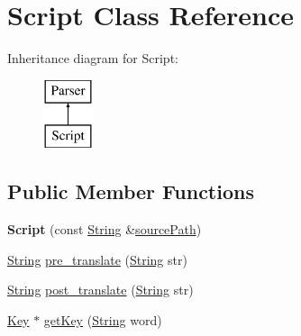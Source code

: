 \hypertarget{classScript}{}\section{Script Class Reference}
\label{classScript}
Inheritance diagram for Script\+:\begin{figure}[H]
\begin{center}
\leavevmode
\includegraphics[height=2.000000cm]{classScript}
\end{center}
\end{figure}
\subsection*{Public Member Functions}
\begin{DoxyCompactItemize}
\item 
\mbox{\label{classScript_ad9e14ce089abb34c1acb97fcfd161b54}} 
{\bfseries Script} (const \mbox{\hyperlink{classString}{String}} \&\mbox{\hyperlink{classParser_a9af73d63c4685837209f362dababa554}{source\+Path}})
\item 
\mbox{\hyperlink{classString}{String}} \mbox{\hyperlink{classScript_af94dd912c6276f5130d13740d775200c}{pre\+\_\+translate}} (\mbox{\hyperlink{classString}{String}} str)
\item 
\mbox{\hyperlink{classString}{String}} \mbox{\hyperlink{classScript_a754cc2f448013d0a3b400088e460fbe4}{post\+\_\+translate}} (\mbox{\hyperlink{classString}{String}} str)
\item 
\mbox{\hyperlink{classKey}{Key}} $\ast$ \mbox{\hyperlink{classScript_a027acbd1cfa4440c9eb51a2b6c91c6a0}{get\+Key}} (\mbox{\hyperlink{classString}{String}} word)
\end{DoxyCompactItemize}
